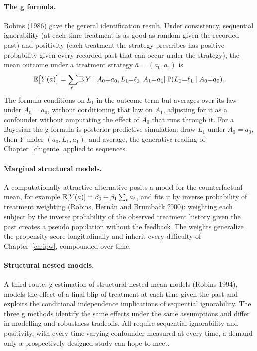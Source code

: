 \paragraph{The g formula.} Robins (1986) gave the general identification result. Under consistency, sequential ignorability (at each time treatment is as good as random given the recorded past) and positivity (each treatment the strategy prescribes has positive probability given every recorded past that can occur under the strategy), the mean outcome under a treatment strategy $\bar a=(a_0,a_1)$ is
\[
\mathbb{E}\bigl[Y(\bar a)\bigr] = \sum_{\ell_1} \mathbb{E}[Y\mid A_0{=}a_0, L_1{=}\ell_1, A_1{=}a_1]\;\mathbb{P}(L_1{=}\ell_1\mid A_0{=}a_0).
\]
The formula conditions on $L_1$ in the outcome term but averages over its law under $A_0=a_0$, without conditioning that law on $A_1$, adjusting for it as a confounder without amputating the effect of $A_0$ that runs through it. For a Bayesian the g formula is posterior predictive simulation: draw $L_1$ under $A_0=a_0$, then $Y$ under $(a_0, L_1, a_1)$, and average, the generative reading of Chapter~\ref{ch:gente} applied to sequences.

\paragraph{Marginal structural models.} A computationally attractive alternative posits a model for the counterfactual mean, for example $\mathbb{E}[Y(\bar a)] = \beta_0 + \beta_1\sum_t a_t$, and fits it by inverse probability of treatment weighting (Robins, Hern\'an and Brumback 2000): weighting each subject by the inverse probability of the observed treatment history given the past creates a pseudo population without the feedback. The weights generalize the propensity score longitudinally and inherit every difficulty of Chapter~\ref{ch:ipw}, compounded over time.

\paragraph{Structural nested models.} A third route, g estimation of structural nested mean models (Robins 1994), models the effect of a final blip of treatment at each time given the past and exploits the conditional independence implications of sequential ignorability. The three g methods identify the same effects under the same assumptions and differ in modelling and robustness tradeoffs. All require sequential ignorability and positivity, with every time varying confounder measured at every time, a demand only a prospectively designed study can hope to meet.

